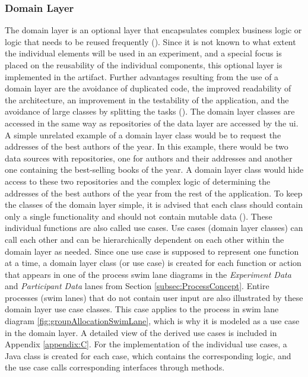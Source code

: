 \subsubsection{Domain Layer}

The domain layer is an optional layer that encapsulates complex business logic or logic that needs to be reused frequently (\cite{Google.2023}). Since it is not known to what extent the individual elements will be used in an experiment, and a special focus is placed on the reusability of the individual components, this optional layer is implemented in the artifact. Further advantages resulting from the use of a domain layer are the avoidance of duplicated code, the improved readability of the architecture, an improvement in the testability of the application, and the avoidance of large classes by splitting the tasks (\cite{Google.2023}). The domain layer classes are accessed in the same way as repositories of the data layer are accessed by the \ac{ui}. A simple unrelated example of a domain layer class would be to request the addresses of the best authors of the year. In this example, there would be two data sources with repositories, one for authors and their addresses and another one containing the best-selling books of the year. A domain layer class would hide access to these two repositories and the complex logic of determining the addresses of the best authors of the year from the rest of the application. To keep the classes of the domain layer simple, it is advised that each class should contain only a single functionality and should not contain mutable data (\cite{Google.2023}). These individual functions are also called use cases. Use cases (domain layer classes) can call each other and can be hierarchically dependent on each other within the domain layer as needed. Since one use case is supposed to represent one function at a time, a domain layer class (or use case) is created for each function or action that appears in one of the process swim lane diagrams in the \textit{Experiment Data} and \textit{Participant Data} lanes from Section \ref{subsec:ProcessConcept}. Entire processes (swim lanes) that do not contain user input are also illustrated by these domain layer use case classes. This case applies to the process in swim lane diagram \ref{fig:groupAllocationSwimLane}, which is why it is modeled as a use case in the domain layer. A detailed view of the derived use cases is included in Appendix \ref{appendix:C}. For the implementation of the individual use cases, a Java class is created for each case, which contains the corresponding logic, and the use case calls corresponding interfaces through methods.


